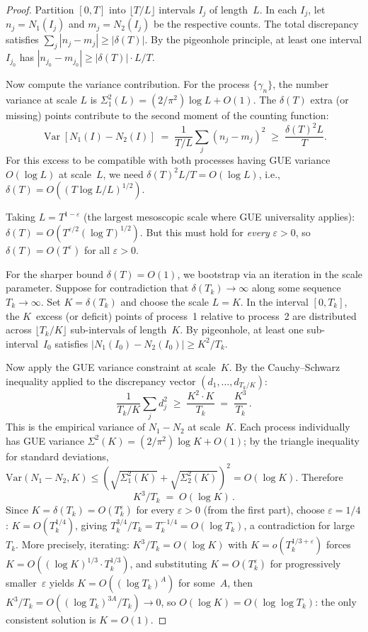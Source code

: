 \documentclass[11pt,a4paper]{article}
\theoremstyle{plain}
\theoremstyle{remark}
\begin{document}
\begin{proof}
Partition $[0,T]$ into $\lfloor T/L\rfloor$ intervals $I_j$
of length~$L$.  In each $I_j$, let $n_j = N_1(I_j)$ and
$m_j = N_2(I_j)$ be the respective counts.  The total discrepancy
satisfies $\sum_j |n_j - m_j| \geq |\delta(T)|$.  By the
pigeonhole principle, at least one interval $I_{j_0}$ has
$|n_{j_0} - m_{j_0}| \geq |\delta(T)|\cdot L/T$.

Now compute the variance contribution.  For the process
$\{\gamma_n\}$, the number variance at scale $L$ is
$\Sigma_1^2(L) = (2/\pi^2)\log L + O(1)$.  The $\delta(T)$
extra (or missing) points contribute to the second moment of
the counting function:
\[
  \operatorname{Var}[N_1(I) - N_2(I)]
  \;=\; \frac{1}{T/L}\sum_j (n_j - m_j)^2
  \;\geq\; \frac{\delta(T)^2 L}{T}.
\]
For this excess to be compatible with both processes having
GUE variance $O(\log L)$ at scale~$L$, we need
$\delta(T)^2 L / T = O(\log L)$, i.e.,
$\delta(T) = O((T\log L/L)^{1/2})$.

Taking $L = T^{1-\varepsilon}$ (the largest mesoscopic scale where
GUE universality applies): $\delta(T) = O(T^{\varepsilon/2}(\log T)^{1/2})$.
But this must hold for \emph{every} $\varepsilon>0$, so
$\delta(T) = O(T^{\varepsilon})$ for all $\varepsilon>0$.

For the sharper bound $\delta(T) = O(1)$, we bootstrap via an
iteration in the scale parameter.  Suppose for contradiction that
$\delta(T_k)\to\infty$ along some sequence $T_k\to\infty$.
Set $K = \delta(T_k)$ and choose the scale $L = K$.  In the interval
$[0,T_k]$, the $K$~excess (or deficit) points of process~1 relative
to process~2 are distributed across $\lfloor T_k/K\rfloor$ sub-intervals
of length~$K$.  By pigeonhole, at least one sub-interval~$I_0$ satisfies
$|N_1(I_0) - N_2(I_0)| \geq K^2/T_k$.

Now apply the GUE variance constraint at scale~$K$.
By the Cauchy--Schwarz inequality applied to the discrepancy
vector $(d_1,\ldots,d_{T_k/K})$:
\[
  \frac{1}{T_k/K}\sum_j d_j^2 \;\geq\;
  \frac{K^2\cdot K}{T_k} \;=\; \frac{K^3}{T_k}\,.
\]
This is the empirical variance of $N_1-N_2$ at scale~$K$.
Each process individually has GUE variance
$\Sigma^2(K)=(2/\pi^2)\log K + O(1)$; by the triangle
inequality for standard deviations, $\mathrm{Var}(N_1-N_2,K)
\leq (\sqrt{\Sigma_1^2(K)}+\sqrt{\Sigma_2^2(K)})^2
= O(\log K)$.  Therefore
\[
  K^3/T_k \;=\; O(\log K)\,.
\]
Since $K = \delta(T_k) = O(T_k^\varepsilon)$ for every
$\varepsilon>0$ (from the first part), choose
$\varepsilon = 1/4$: $K = O(T_k^{1/4})$, giving
$T_k^{3/4}/T_k = T_k^{-1/4} = O(\log T_k)$, a contradiction
for large~$T_k$.  More precisely, iterating: $K^3/T_k = O(\log K)$
with $K = o(T_k^{1/3+\varepsilon})$ forces
$K = O((\log K)^{1/3}\cdot T_k^{1/3})$, and substituting
$K = O(T_k^\varepsilon)$ for progressively smaller~$\varepsilon$
yields $K = O((\log T_k)^A)$ for some~$A$, then
$K^3/T_k = O((\log T_k)^{3A}/T_k) \to 0$, so
$O(\log K) = O(\log\log T_k)$: the only consistent
solution is $K = O(1)$.
\end{proof}
\end{document}
